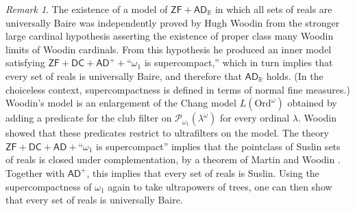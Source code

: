 \documentclass[fleqn, 11pt]{amsart}
\theoremstyle{plain}
\theoremstyle{definition}
\theoremstyle{remark}
\newtheorem{rem}[thm]{Remark} \newtheorem*{rem*}{Remark}
\newcommand{\Ord}{\mathrm{Ord}}
\newcommand{\bbR}{\mathbb{R}}
\newcommand{\ZF}{\mathsf{ZF}}
\newcommand{\ADR}{\mathsf{AD}_{\bbR}}
\newcommand{\powerset}{\mathcal{P}}
\begin{document}
\begin{rem}\label{rem-woodin-remark}
The existence of a model of $\ZF + \ADR$ in which all sets of reals are universally Baire was independently proved by Hugh Woodin from the stronger large cardinal hypothesis asserting the existence of proper class many Woodin limits of Woodin cardinals. 
From this hypothesis he produced an inner model satisfying $\mathsf{ZF} + \mathsf{DC} + \mathsf{AD}^+ + {}$``$\omega_1$ is supercompact,'' which in turn implies that every set of reals is universally Baire, and therefore that $\ADR$ holds. (In the choiceless context, supercompactness is defined in terms of normal fine measures.)
 Woodin's model is an enlargement of the Chang model $L(\Ord^\omega)$ obtained by adding a predicate for the club filter on $\powerset_{\omega_1}(\lambda^\omega)$ for every ordinal $\lambda$.
 Woodin showed that these predicates restrict to ultrafilters on the model.
 The theory $\mathsf{ZF} + \mathsf{DC} + \mathsf{AD} + {}$``$\omega_1$ is supercompact'' implies that
 the pointclass of Suslin sets of reals is closed under complementation, by a theorem of Martin and Woodin \cite{MarWooWeaklyHom}. Together with $\mathsf{AD}^+$, this implies that every set of reals is Suslin.
 Using the supercompactness of $\omega_{1}$ again to take ultrapowers of trees, one can then show that every set of reals is universally Baire.
\end{rem}
\end{document}
